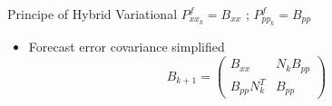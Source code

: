 \documentclass{beamer}
\begin{document}
\begin{frame}{Principe of Hybrid Variational}
$P_{xx_k}^f =  B_{xx}$ ; $P_{pp_k}^f = B_{pp}$  \\
\begin{itemize}
            \item Forecast error covariance simplified
                \begin{equation}
                B_{k+1} = 
                \begin{pmatrix}
                B_{xx} & N_k B_{pp} \\
                 B_{pp}N_k^T & B_{pp}
                \end{pmatrix} 
                \label{CovHyb}
                \end{equation}
\end{itemize}
\end{frame}
\end{document}
